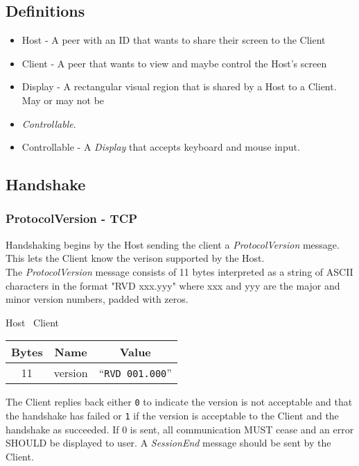 \documentclass{article}
\begin{document}
    \subsection{Definitions}

    \begin{itemize}
        \item Host - A peer with an ID that wants to share their screen to the Client
        \item Client - A peer that wants to view and maybe control the Host's screen
        \item Display - A rectangular visual region that is shared by a Host to a Client. May or may not be
        \item \emph{Controllable}.
        \item Controllable - A \emph{Display} that accepts keyboard and mouse input.
    \end{itemize}

    \subsection{Handshake}

    \subsubsection{ProtocolVersion - TCP}
    Handshaking begins by the Host sending the client a \emph{ProtocolVersion} message. This lets the Client know the
    verison supported by the Host.\\

    The \emph{ProtocolVersion} message consists of 11 bytes interpreted as a string of ASCII characters in the format
    "RVD xxx.yyy" where xxx and yyy are the major and minor version numbers, padded with zeros.

    \begin{center}
        Host \textrightarrow\ Client\\
        \begin{tabular}{|c|c|c|}
            \hline
            \textbf{Bytes} & \textbf{Name} & \textbf{Value}           \\
            \hline
            11             & version       & ``\texttt{RVD 001.000}'' \\
            \hline
        \end{tabular}
    \end{center}

    The Client replies back either \texttt{0} to indicate the version is not acceptable and that the handshake has
    failed or \texttt{1} if the version is acceptable to the Client and the handshake as succeeded. If 0 is sent, all
    communication MUST cease and an error SHOULD be displayed to user. A \emph{SessionEnd} message should be sent by
    the Client. %
\end{document}
